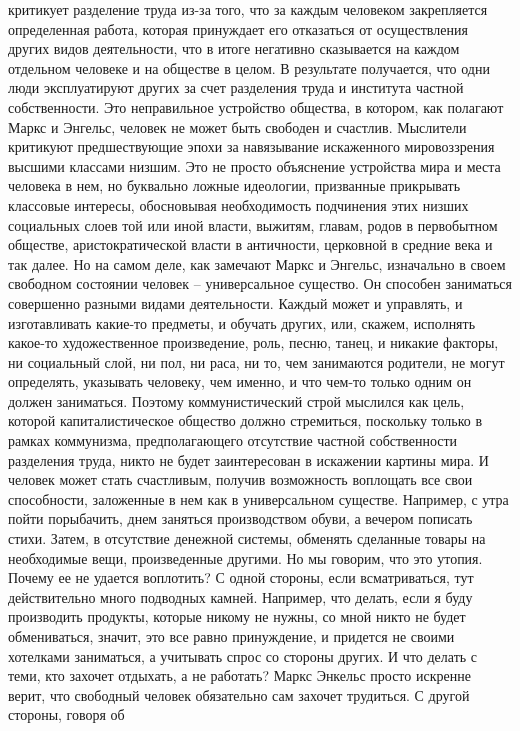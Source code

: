 критикует разделение труда из-за того, что за каждым человеком закрепляется
определенная работа, которая принуждает его отказаться от осуществления других
видов деятельности, что в итоге негативно сказывается на каждом отдельном
человеке и на обществе в целом. В результате получается, что одни люди
эксплуатируют других за счет разделения труда и института частной собственности.
Это неправильное устройство общества, в котором, как полагают Маркс и Энгельс,
человек не может быть свободен и счастлив. Мыслители критикуют предшествующие
эпохи за навязывание искаженного мировоззрения высшими классами низшим. Это не
просто объяснение устройства мира и места человека в нем, но буквально ложные
идеологии, призванные прикрывать классовые интересы, обосновывая необходимость
подчинения этих низших социальных слоев той или иной власти, выжитям, главам,
родов в первобытном обществе, аристократической власти в античности, церковной в
средние века и так далее. Но на самом деле, как замечают Маркс и Энгельс,
изначально в своем свободном состоянии человек – универсальное существо. Он
способен заниматься совершенно разными видами деятельности. Каждый может и
управлять, и изготавливать какие-то предметы, и обучать других, или, скажем,
исполнять какое-то художественное произведение, роль, песню, танец, и никакие
факторы, ни социальный слой, ни пол, ни раса, ни то, чем занимаются родители, не
могут определять, указывать человеку, чем именно, и что чем-то только одним он
должен заниматься. Поэтому коммунистический строй мыслился как цель, которой
капиталистическое общество должно стремиться, поскольку только в рамках
коммунизма, предполагающего отсутствие частной собственности разделения труда,
никто не будет заинтересован в искажении картины мира. И человек может стать
счастливым, получив возможность воплощать все свои способности, заложенные в нем
как в универсальном существе. Например, с утра пойти порыбачить, днем заняться
производством обуви, а вечером пописать стихи. Затем, в отсутствие денежной
системы, обменять сделанные товары на необходимые вещи, произведенные другими.
Но мы говорим, что это утопия. Почему ее не удается воплотить? С одной стороны,
если всматриваться, тут действительно много подводных камней. Например, что
делать, если я буду производить продукты, которые никому не нужны, со мной никто
не будет обмениваться, значит, это все равно принуждение, и придется не своими
хотелками заниматься, а учитывать спрос со стороны других. И что делать с теми,
кто захочет отдыхать, а не работать? Маркс Энкельс просто искренне верит, что
свободный человек обязательно сам захочет трудиться. С другой стороны, говоря об
